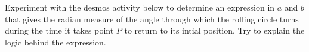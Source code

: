 \documentclass{ximera}
\begin{document}
\begin{exploration}\label{exp:angles2}
Experiment with the desmos activity below to determine an expression in $a$ and $b$ that gives the radian measure of the angle through which the rolling circle turns during the time it takes point $P$ to return to its intial position. Try to explain the logic behind the expression.


 
\begin{onlineOnly}
    \begin{center}
\end{center}
\end{onlineOnly}
\end{exploration}
\end{document}
